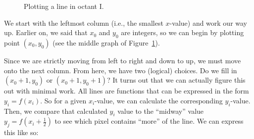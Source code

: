 \documentclass[12pt,letterpaper]{article}
\begin{document}
\begin{figure}
  \centering
  \begin{minipage}{0.31\textwidth}
  \end{minipage}
  \hfill
  \begin{minipage}{0.31\textwidth}
  \end{minipage}
  \hfill
  \begin{minipage}{0.31\textwidth}
  \end{minipage}
  \caption{\label{fig:oct1} Plotting a line in octant I.}
\end{figure}

We start with the leftmost column (i.e., the smallest $x$-value) and work our way up.
Earlier on, we said that $x_0$ and $y_0$ are integers, so we can begin by plotting point $(x_0, y_0)$ (see the middle graph of Figure~\ref{fig:oct1}).

Since we are strictly moving from left to right and down to up, we must move onto the next column.
From here, we have two (logical) choices.
Do we fill in $(x_0 + 1, y_0)$ or $(x_0 + 1, y_0 + 1)$?
It turns out that we can actually figure this out with minimal work.
All lines are functions that can be expressed in the form $y_i = f(x_i)$.
So for a given $x_i$-value, we can calculate the corresponding $y_i$-value.
Then, we compare that calculated $y_i$ value to the \enquote{midway} value $y_j = f\left(x_i + \frac{1}{2}\right)$ to see which pixel contains \enquote{more} of the line.
We can express this like so:
\end{document}
